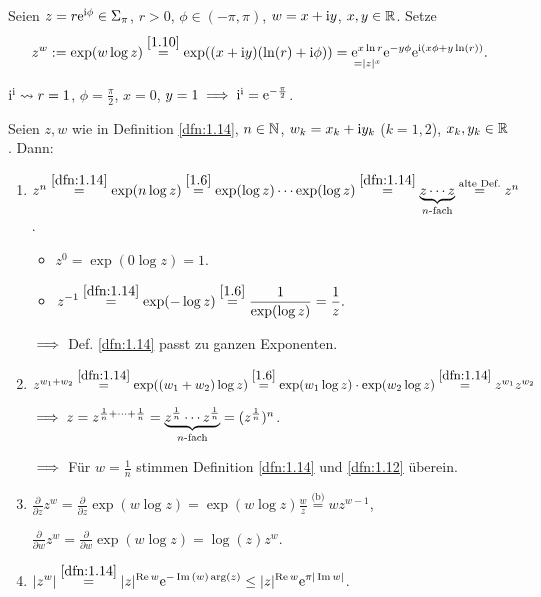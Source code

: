 \documentclass[a4paper,twoside,DIV15,BCOR12mm]{scrbook}
\begin{document}
\begin{dfn}\label{dfn:1.14}
Seien $z=r\mathrm{e}^{\mathrm{i}\phi}\in\Sigma_\pi$, $r>0$, $\phi\in(-\pi,\pi)$, $w = x+\mathrm{i} y$, $x,y\in\mathbb{R}$. Setze
\[z^w := \exp(w\log z)\stackrel{\eqref{1.10}}{=}\exp((x+\mathrm{i} y)(\ln(r)+\mathrm{i}\phi)) = \underset{=|z|^x}{\mathrm{e}^{x\ln r}} \mathrm{e}^{-y\phi}\mathrm{e}^{\mathrm{i}(x\phi + y\ln(r))}.\]
\end{dfn}

\begin{bsp*}
$\mathrm{i}^{\mathrm{i}} \leadsto r = 1$, $\phi = \frac{\pi}{2}$, $x =0$, $y=1 \implies \mathrm{i}^{\mathrm{i}} = \mathrm{e}^{-\frac{\pi}{2}}$.
\end{bsp*}

\begin{bem}\label{bem:1.15}
Seien $z,w$ wie in Definition \ref{dfn:1.14}, $n\in\mathbb{N}$, $w_k=x_k+\mathrm{i} y_k$ ($k=1,2$), $x_k,y_k\in\mathbb{R}$. Dann:
\begin{enumerate}
\item $z^n \stackrel{\ref{dfn:1.14}}{=} \exp (n \log z) \stackrel{\eqref{1.6}}{=} \exp(\log z)\dotsm\exp(\log z) \stackrel{\ref{dfn:1.14}}{=} \underbrace{z\dotsm z}_{n\text{-fach}} \stackrel{\text{alte Def.}}{=} z^n$.
\begin{itemize}
\item $z^0 = \exp(0\log z) = 1$.
\item $\displaystyle z^{-1} \stackrel{\ref{dfn:1.14}}{=} \exp(-\log z) \stackrel{\eqref{1.6}}{=}\frac{1}{\exp(\log z)} = \frac{1}{z}.$
\end{itemize}
$\implies$ Def. \ref{dfn:1.14} passt zu ganzen Exponenten.

\item $z^{w_1+w_2} \stackrel{\ref{dfn:1.14}}{=} \exp((w_1+w_2)\log z) \stackrel{\eqref{1.6}}{=}\exp(w_1\log z)\cdot\exp(w_2\log z) \stackrel{\ref{dfn:1.14}}{=}z^{w_1}z^{w_2}$

$\implies z = z^{\frac{1}{n} + \dotsm + \frac{1}{n}} = \underbrace{z^{\frac{1}{n}}\dotsm z^{\frac{1}{n}}}_{n\text{-fach}} = (z^{\frac{1}{n}})^n$.

$\implies$ Für $w=\frac{1}{n}$ stimmen Definition \ref{dfn:1.14} und \ref{dfn:1.12} überein.

\item $\displaystyle \frac{\partial}{\partial z}z^w = \frac{\partial}{\partial z}\exp(w \log z) = \exp(w\log z)\frac{w}{z} \stackrel{\text{(b)}}{=}wz^{w-1}$,

$\displaystyle\frac{\partial}{\partial w} z^w = \frac{\partial}{\partial w} \exp (w\log z) = \log (z) z^w$.

\item $\displaystyle |z^w| \stackrel{\ref{dfn:1.14}}{=} |z|^{\operatorname{Re}{w}}\mathrm{e}^{-\operatorname{Im}{(w)}\arg(z)} \leq |z|^{\operatorname{Re}{w}}\mathrm{e}^{\pi|\operatorname{Im}{w}|}$.
\end{enumerate}
\end{bem}
\end{document}
